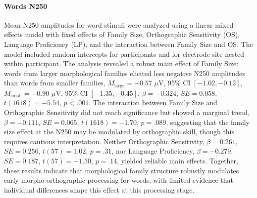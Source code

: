 \documentclass[utf8]{FrontiersinHarvard} %
\begin{document}
\paragraph*{Words N250}
Mean N250 amplitudes for word stimuli were analyzed using a linear mixed-effects model with fixed effects of Family Size, Orthographic Sensitivity (OS), Language Proficiency (LP), and the interaction between Family Size and OS. The model included random intercepts for participants and for electrode site nested within participant. The analysis revealed a robust main effect of Family Size: words from larger morphological families elicited less negative N250 amplitudes than words from smaller families, $M_{\mathrm{large}} = -0.57$ $\mu$V, 95\% CI $[-1.02, -0.12]$, $M_{\mathrm{small}} = -0.90$ $\mu$V, 95\% CI $[-1.35, -0.45]$, $\beta = -0.324$, $SE = 0.058$, $t(1618) = -5.54$, $p < .001$. The interaction between Family Size and Orthographic Sensitivity did not reach significance but showed a marginal trend, $\beta = -0.111$, $SE = 0.065$, $t(1618) = -1.70$, $p = .089$, suggesting that the family size effect at the N250 may be modulated by orthographic skill, though this requires cautious interpretation. Neither Orthographic Sensitivity, $\beta = 0.261$, $SE = 0.256$, $t(57) = 1.02$, $p = .31$, nor Language Proficiency, $\beta = -0.279$, $SE = 0.187$, $t(57) = -1.50$, $p = .14$, yielded reliable main effects. Together, these results indicate that morphological family structure robustly modulates early morpho-orthographic processing for words, with limited evidence that individual differences shape this effect at this processing stage.
\end{document}
